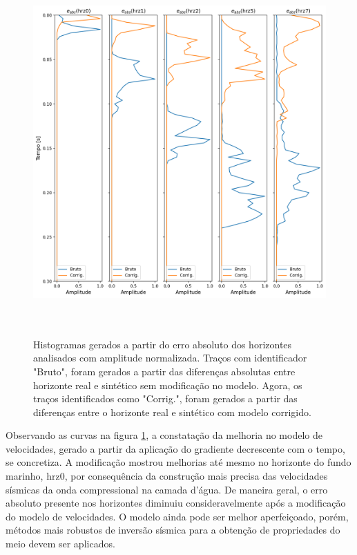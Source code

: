 \documentclass[
	12pt,				%
	openright,			%
	oneside,			%
	a4paper,			%
	english,			%
	brazil				%
	]{abntex2}
\begin{document}
	\begin{figure}[htp!]
		\centering
		\includegraphics[width=14cm,height=14cm]{../imagens/analise.png}
		\caption{Histogramas gerados a partir do erro absoluto dos horizontes analisados com amplitude normalizada. Traços com identificador "Bruto", foram gerados a partir das diferenças absolutas entre horizonte real e sintético sem modificação no modelo. Agora, os traços identificados como "Corrig.", foram gerados a partir das diferenças entre o horizonte real e sintético com modelo corrigido.}
		\label{analise}
	\end{figure}

	Observando as curvas na figura \ref{analise}, a constatação da melhoria no modelo de velocidades, gerado a partir da aplicação do gradiente decrescente com o tempo, se concretiza. A modificação mostrou melhorias até mesmo no horizonte do fundo marinho, hrz0, por consequência da construção mais precisa das velocidades sísmicas da onda compressional na camada d'água. De maneira geral, o erro absoluto presente nos horizontes diminuiu consideravelmente após a modificação do modelo de velocidades. O modelo ainda pode ser melhor aperfeiçoado, porém, métodos mais robustos de inversão sísmica para a obtenção de propriedades do meio devem ser aplicados.  
\end{document}

